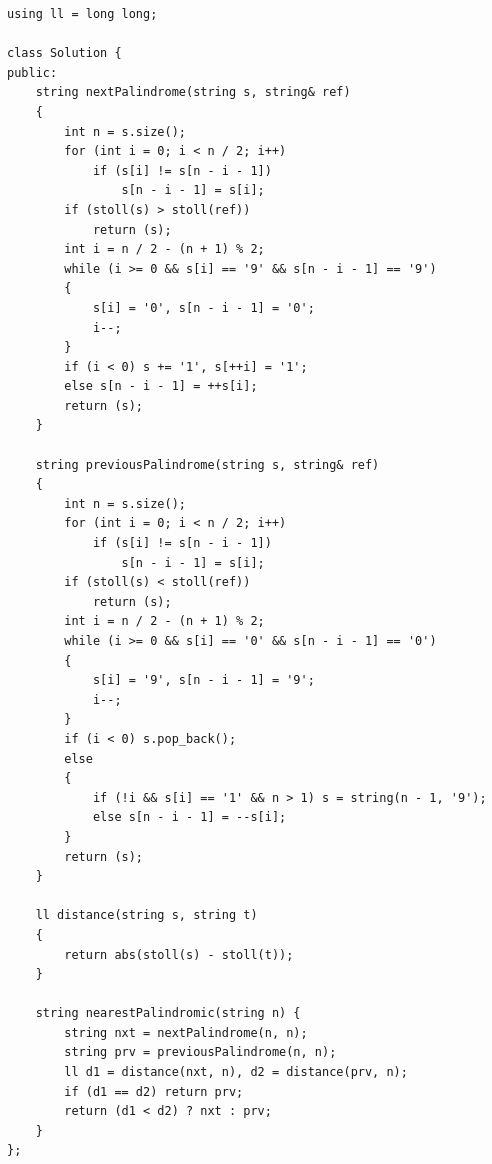 \documentclass{article}
\begin{document}
\begin{verbatim}
using ll = long long;

class Solution {
public:
    string nextPalindrome(string s, string& ref)
    {
        int n = s.size();
        for (int i = 0; i < n / 2; i++)
            if (s[i] != s[n - i - 1])
                s[n - i - 1] = s[i];
        if (stoll(s) > stoll(ref))
            return (s);
        int i = n / 2 - (n + 1) % 2;
        while (i >= 0 && s[i] == '9' && s[n - i - 1] == '9')
        {
            s[i] = '0', s[n - i - 1] = '0';
            i--;
        }
        if (i < 0) s += '1', s[++i] = '1';
        else s[n - i - 1] = ++s[i];
        return (s);
    }

    string previousPalindrome(string s, string& ref)
    {
        int n = s.size();
        for (int i = 0; i < n / 2; i++)
            if (s[i] != s[n - i - 1])
                s[n - i - 1] = s[i];
        if (stoll(s) < stoll(ref))
            return (s);
        int i = n / 2 - (n + 1) % 2;
        while (i >= 0 && s[i] == '0' && s[n - i - 1] == '0')
        {
            s[i] = '9', s[n - i - 1] = '9';
            i--;
        }
        if (i < 0) s.pop_back();
        else
        {
            if (!i && s[i] == '1' && n > 1) s = string(n - 1, '9');
            else s[n - i - 1] = --s[i];
        }
        return (s);
    }

    ll distance(string s, string t)
    {
        return abs(stoll(s) - stoll(t));
    }

    string nearestPalindromic(string n) {
        string nxt = nextPalindrome(n, n);
        string prv = previousPalindrome(n, n);
        ll d1 = distance(nxt, n), d2 = distance(prv, n);
        if (d1 == d2) return prv;
        return (d1 < d2) ? nxt : prv;
    }
};
\end{verbatim}
\end{document}
